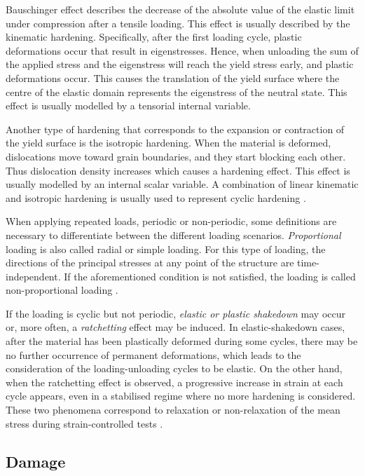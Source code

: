 Bauschinger effect describes the decrease of the absolute value of the elastic limit under compression after a tensile loading. This effect is usually described by the kinematic hardening. Specifically, after the first loading cycle, plastic deformations occur that result in eigenstresses. Hence, when unloading the sum of the applied stress and the eigenstress will reach the yield stress early, and plastic deformations occur. This causes the translation of the yield surface where the centre of the elastic domain represents the eigenstress of the neutral state. This effect is usually modelled by a tensorial internal variable.

Another type of hardening that corresponds to the expansion or contraction of the yield surface is the isotropic hardening. When the material is deformed, dislocations move toward grain boundaries, and they start blocking each other. Thus dislocation density increases which causes a hardening effect. This effect is usually modelled by an internal scalar variable. A combination of linear kinematic and isotropic hardening is usually used to represent cyclic hardening \parencite{lemaitre1994mechanics}.

When applying repeated loads, periodic or non-periodic, some definitions are necessary to differentiate between the different loading scenarios. \emph{Proportional} loading is also called radial or simple loading. For this type of loading, the directions of the principal stresses at any point of the structure are time-independent. If the aforementioned condition is not satisfied, the loading is called non-proportional loading \parencite{lemaitre2005engineering}.

If the loading is cyclic but not periodic, \emph{elastic or plastic shakedown} may occur or, more often, a \emph{ratchetting} effect may be induced. In elastic-shakedown cases, after the material has been plastically deformed during some cycles, there may be no further occurrence of permanent deformations, which leads to the consideration of the loading-unloading cycles to be elastic. On the other hand, when the ratchetting effect is observed, a progressive increase in strain at each cycle appears, even in a stabilised regime where no more hardening is considered. These two phenomena correspond to relaxation or non-relaxation of the mean stress during strain-controlled tests \parencite{lemaitre2005engineering}.

\subsection{Damage}

